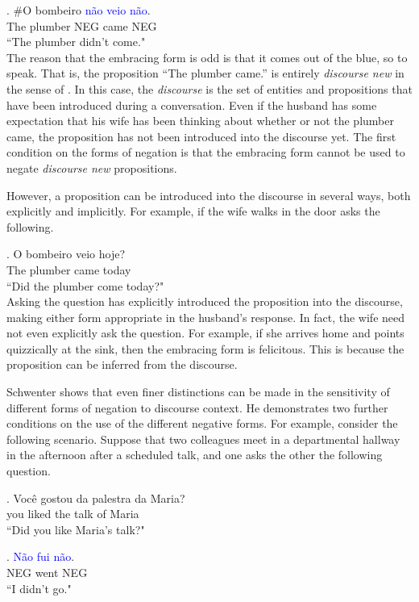 \documentclass[12pt]{upenndiss}
\theoremstyle{definition} \newtheorem{definition}{Definition}
\begin{document}
\exg. \#O bombeiro \textcolor{blue}{n{\~a}o} \textcolor{blue}{veio} \textcolor{blue}{n{\~a}o}.\\
	The plumber NEG came NEG\\
	``The plumber didn't come."\\

The reason that the embracing form is odd is that it comes out of the blue, so to speak. That is, the proposition ``The plumber came.'' is entirely \emph{discourse new} in the sense of \cite{prince:1992}. In this case, the \emph{discourse} is the set of entities and propositions that have been introduced during a conversation.  Even if the husband has some expectation that his wife has been thinking about whether or not the plumber came, the proposition has not been introduced into the discourse yet. The first condition on the forms of negation is that the embracing form cannot be used to negate \emph{discourse new} propositions.

However, a proposition can be introduced into the discourse in several ways, both explicitly and implicitly. For example, if the wife walks in the door asks the following.

\exg.  O bombeiro veio hoje?\\
       The plumber came today\\
         ``Did the plumber come today?"\\

Asking the question has explicitly introduced the proposition into the discourse, making either form appropriate in the husband's response. In fact, the wife need not even explicitly ask the question. For example, if she arrives home and points quizzically at the sink, then the embracing form is felicitous. This is because the proposition can be inferred from the discourse.

Schwenter shows that even finer distinctions can be made in the sensitivity of different forms of negation to discourse context. He demonstrates two further conditions on the use of the different negative forms. For example, consider the following scenario. Suppose that two colleagues meet in a departmental hallway in the afternoon after a scheduled talk, and one asks the other the following question.

\exg. Voc{\^e} gostou da palestra da Maria?\\
	 you liked the talk of Maria\\
	 ``Did you like Maria's talk?"

\exg. \textcolor{blue}{N{\~a}o} \textcolor{blue}{fui} \textcolor{blue}{n{\~a}o}.\\
	 NEG went NEG\\
	 ``I didn't go."\\
\end{document}
